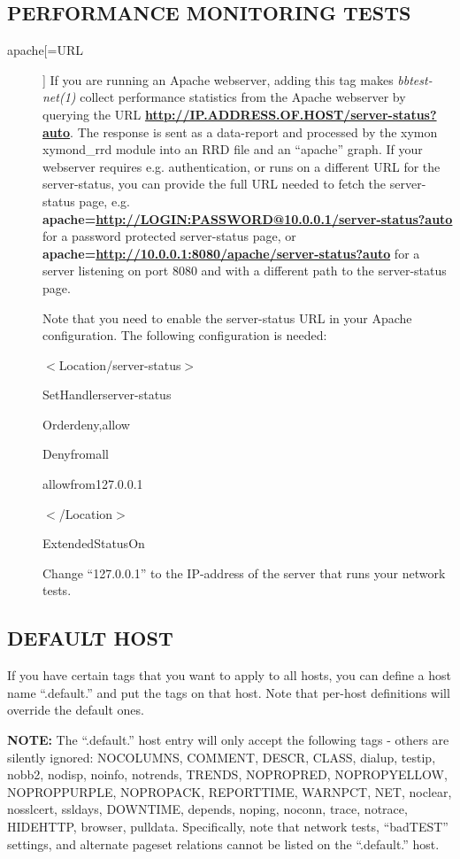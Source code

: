 \subsection{PERFORMANCE MONITORING TESTS}
\begin{description}
\item[apache[=URL]] If you are running an Apache webserver, adding
  this tag makes \emph{bbtest-net(1)} collect performance statistics
  from the Apache webserver by querying the URL
  \textbf{\url{http://IP.ADDRESS.OF.HOST/server-status?auto}}. The
  response is sent as a data-report and processed by the xymon
  xymond\_rrd module into an RRD file and an ``apache'' graph. If
  your webserver requires e.g. authentication, or runs on a different
  URL for the server-status, you can provide the full URL needed to
  fetch the server-status page,
  e.g.
  \textbf{apache=\url{http://LOGIN:PASSWORD@10.0.0.1/server-status?auto}}
  for a password protected server-status page, or
  \textbf{apache=\url{http://10.0.0.1:8080/apache/server-status?auto}}
  for a server listening on port 8080 and with a different path to the
  server-status page. 



  Note that you need to enable the server-status URL in your Apache
  configuration. The following configuration is needed: 



  
$<$Location/server-status$>$  
 
SetHandlerserver-status  
 
Orderdeny,allow  
 
Denyfromall  
 
allowfrom127.0.0.1  
 
$<$/Location$>$  
 
ExtendedStatusOn 


  Change ``127.0.0.1'' to the IP-address of the server that runs your network tests. 


 


\end{description}
\subsection{DEFAULT HOST}
 If you have certain tags that you want to apply to all hosts, you can
 define a host name ``.default.'' and put the tags on that host. Note
 that per-host definitions will override the default ones. 


 \textbf{NOTE:}
 The ``.default.'' host entry will only accept the following tags -
 others are silently ignored: NOCOLUMNS, COMMENT, DESCR, CLASS,
 dialup, testip, nobb2, nodisp, noinfo, notrends, TRENDS, NOPROPRED,
 NOPROPYELLOW, NOPROPPURPLE, NOPROPACK, REPORTTIME, WARNPCT, NET,
 noclear, nosslcert, ssldays, DOWNTIME, depends, noping, noconn,
 trace, notrace, HIDEHTTP, browser, pulldata. Specifically, note that
 network tests, ``badTEST'' settings, and alternate pageset relations
 cannot be listed on the ``.default.'' host. 



